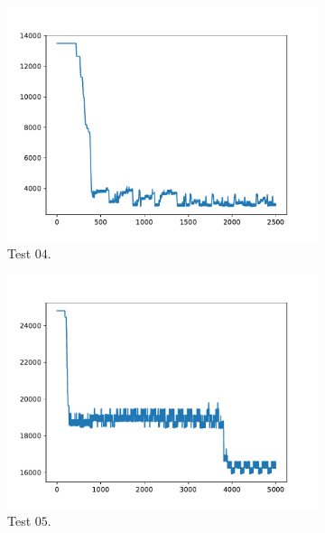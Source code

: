 \begin{figure}[h!]
\begin{subfigure}{0.45\textwidth}
        \includegraphics[width=\textwidth]{../logs/test04.pdf}
        \caption{Test $04$.}
    \end{subfigure}
    \begin{subfigure}{0.45\textwidth}
        \includegraphics[width=\textwidth]{../logs/test05.pdf}
        \caption{Test $05$.}
    \end{subfigure}
    \begin{subfigure}{0.45\textwidth}

\end{subfigure}
\end{figure}
